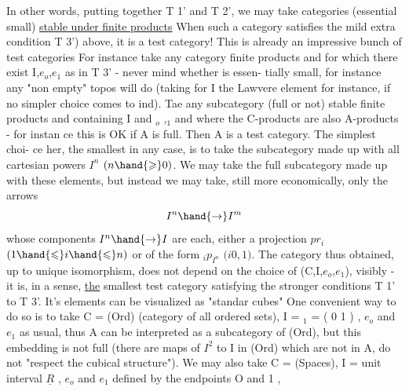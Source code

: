 In other words,  putting together  T 1' and T 2',   we
may  take categories (essential small) \uline{stable under finite products}
When such a category satisfies the mild extra condition T 3') above,  it
is a test category!  This is already an impressive bunch of test categories
For instance take any category   finite products and 
for which there exist I,$e_o$,$e_1$ as in T 3'  -  never mind whether  is essen-%
tially small,  for instance any "non empty" topos will do (taking for I
the Lawvere element for instance,  if no simpler choice comes to ind).
Tae any subcategory  (full or not) stable  finite products and containing
I and \hand{$\Delta$}$_o$ ,\hand{$\Delta$}$_1$ and where the  C-products are also A-products  -  for instan
ce this is OK if A is full.  Then A is a test category.  The simplest choi-%
ce her,  the smallest in any case,  is to take the subcategory made up
with all cartesian powers $I^n$ $(n\hand{\geqslant} 0)$.  We may take the full subcategory
made up with these elements,  but instead we may take, still
more economically,  only the arrows
\[ I^n \hand{\rightarrow} I^m \]
whose  components  $I^n \hand{\rightarrow} I$ are each,  either a projection $pr_i$ $(1\hand{\leqslant} i\hand{\leqslant} n)$ or
of the form \hand{$\delta$}$_i$\hand{$($}$p_{I^n}$\hand{$)$} $(i$\hand{$\in\{$}$0,1$\hand{$\}$}$)$.  The category thus obtained,  up to unique
isomorphism,  does not depend on the choice of (C,I,$e_o$,$e_1$),  visibly -
it is,  in a sense,  \uline{the} smallest test category satisfying the stronger
conditions T 1' to T 3'.   It's elements can be visualized as "standar
cubes" One convenient way to do so is to take C = (Ord) (category of
all ordered sets), I = \hand{$\Delta$}$_1$ = ( \hand{$\{$}0\hand{$\}$} \hand{$\rightarrow$} \hand{$\{$}1\hand{$\}$} ) ,  $e_o$ and $e_1$ as usual,  thus
A can be interpreted as a subcategory of (Ord),  but this embedding is not
full (there are maps of $I^2$ to I in (Ord)  which are not in A,   do not
"respect the cubical structure").  We may also take  C = (Spaces),  I =
unit interval \hand{$\subset$} $\underline{R}$ ,  $e_o$ and $e_1$ defined by the endpoints  O and  1 ,
